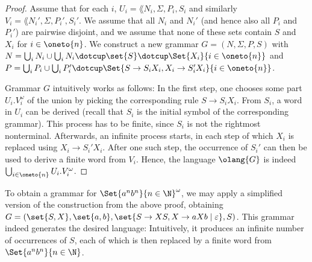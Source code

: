 \documentclass[../../diss.tex]{subfiles}
\begin{document}
\begin{proof}
    Assume that for each $i$, $U_i = \lang{N_i,\Sigma,P_i,S_i}$ and similarly $V_i = \lang{N_i',\Sigma,P_i',S_i'}$.
    We assume \wolog that all $N_i$ and $N_i'$ (and hence also all $P_i$ and $P_i'$) are pairwise disjoint, and we assume that none of these sets contain $S$ and $X_i$ for $i \in \oneto{n}$.
    We construct a new grammar $G = (N,\Sigma,P,S)$ with
    \(
        N = \bigcup_{i} N_i \cup \bigcup_{i} N_i \dotcup \set{ S } \dotcup \Set{ X_i}{i \in \oneto{n}}
    \)
    and
    \(
        P = \bigcup_{i} P_i \cup \bigcup_{i} P_i' \dotcup \Set{ S \to S_i X_i, X_i \to S_i' X_i}{i \in \oneto{n}}
    \).

    Grammar $G$ intuitively works as follows:
    In the first step, one chooses some part $U_i . V_i^\omega$ of the union by picking the corresponding rule $S \to S_i X_i$.
    From $S_i$, a word in $U_i$ can be derived (recall that $S_i$ is the initial symbol of the corresponding grammar).
    This process has to be finite, since $S_i$ is not the rightmost nonterminal.
    Afterwards, an infinite process starts, in each step of which $X_i$ is replaced using $X_i \to S_i' X_i$.
    After one such step, the occurrence of $S_i'$ can then be used to derive a finite word from $V_i$.
    Hence, the language $\olang{G}$ is indeed \(\bigcup_{i \in \oneto{n}} U_i . V_i^\omega \).
\end{proof}

\begin{example}%
\label{Example:OmegaCFGAnBnOmega}%
    To obtain a grammar for $\Set{a^n b^n}{n \in \N}^\omega$, we may apply a simplified version of the construction from the above proof, obtaining $G = (\set{S,X},\set{a,b},\set{ S \to XS, X \to aXb \mid \eps},S)$.
    This grammar indeed generates the desired language:
    Intuitively, it produces an infinite number of occurrences of $S$, each of which is then replaced by a finite word from $\Set{a^n b^n}{n \in \N}$.
\end{example}
\end{document}
